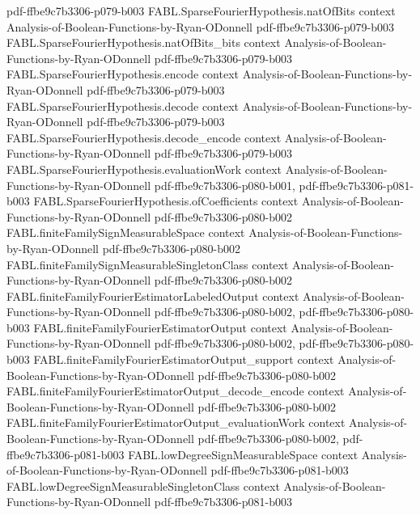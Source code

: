 \begin{theorem}
  {pdf-ffbe9c7b3306-p079-b003}
\proofstep
  {FABL.SparseFourierHypothesis.natOfBits}
  {context}
  {Analysis-of-Boolean-Functions-by-Ryan-ODonnell}
  {pdf-ffbe9c7b3306-p079-b003}
\proofstep
  {FABL.SparseFourierHypothesis.natOfBits_bits}
  {context}
  {Analysis-of-Boolean-Functions-by-Ryan-ODonnell}
  {pdf-ffbe9c7b3306-p079-b003}
\proofstep
  {FABL.SparseFourierHypothesis.encode}
  {context}
  {Analysis-of-Boolean-Functions-by-Ryan-ODonnell}
  {pdf-ffbe9c7b3306-p079-b003}
\proofstep
  {FABL.SparseFourierHypothesis.decode}
  {context}
  {Analysis-of-Boolean-Functions-by-Ryan-ODonnell}
  {pdf-ffbe9c7b3306-p079-b003}
\proofstep
  {FABL.SparseFourierHypothesis.decode_encode}
  {context}
  {Analysis-of-Boolean-Functions-by-Ryan-ODonnell}
  {pdf-ffbe9c7b3306-p079-b003}
\proofstep
  {FABL.SparseFourierHypothesis.evaluationWork}
  {context}
  {Analysis-of-Boolean-Functions-by-Ryan-ODonnell}
  {pdf-ffbe9c7b3306-p080-b001,
    pdf-ffbe9c7b3306-p081-b003}
\proofstep
  {FABL.SparseFourierHypothesis.ofCoefficients}
  {context}
  {Analysis-of-Boolean-Functions-by-Ryan-ODonnell}
  {pdf-ffbe9c7b3306-p080-b002}
\proofstep
  {FABL.finiteFamilySignMeasurableSpace}
  {context}
  {Analysis-of-Boolean-Functions-by-Ryan-ODonnell}
  {pdf-ffbe9c7b3306-p080-b002}
\proofstep
  {FABL.finiteFamilySignMeasurableSingletonClass}
  {context}
  {Analysis-of-Boolean-Functions-by-Ryan-ODonnell}
  {pdf-ffbe9c7b3306-p080-b002}
\proofstep
  {FABL.finiteFamilyFourierEstimatorLabeledOutput}
  {context}
  {Analysis-of-Boolean-Functions-by-Ryan-ODonnell}
  {pdf-ffbe9c7b3306-p080-b002,
    pdf-ffbe9c7b3306-p080-b003}
\proofstep
  {FABL.finiteFamilyFourierEstimatorOutput}
  {context}
  {Analysis-of-Boolean-Functions-by-Ryan-ODonnell}
  {pdf-ffbe9c7b3306-p080-b002,
    pdf-ffbe9c7b3306-p080-b003}
\proofstep
  {FABL.finiteFamilyFourierEstimatorOutput_support}
  {context}
  {Analysis-of-Boolean-Functions-by-Ryan-ODonnell}
  {pdf-ffbe9c7b3306-p080-b002}
\proofstep
  {FABL.finiteFamilyFourierEstimatorOutput_decode_encode}
  {context}
  {Analysis-of-Boolean-Functions-by-Ryan-ODonnell}
  {pdf-ffbe9c7b3306-p080-b002}
\proofstep
  {FABL.finiteFamilyFourierEstimatorOutput_evaluationWork}
  {context}
  {Analysis-of-Boolean-Functions-by-Ryan-ODonnell}
  {pdf-ffbe9c7b3306-p080-b002,
    pdf-ffbe9c7b3306-p081-b003}
\proofstep
  {FABL.lowDegreeSignMeasurableSpace}
  {context}
  {Analysis-of-Boolean-Functions-by-Ryan-ODonnell}
  {pdf-ffbe9c7b3306-p081-b003}
\proofstep
  {FABL.lowDegreeSignMeasurableSingletonClass}
  {context}
  {Analysis-of-Boolean-Functions-by-Ryan-ODonnell}
  {pdf-ffbe9c7b3306-p081-b003}
\proofstep

\end{theorem}
